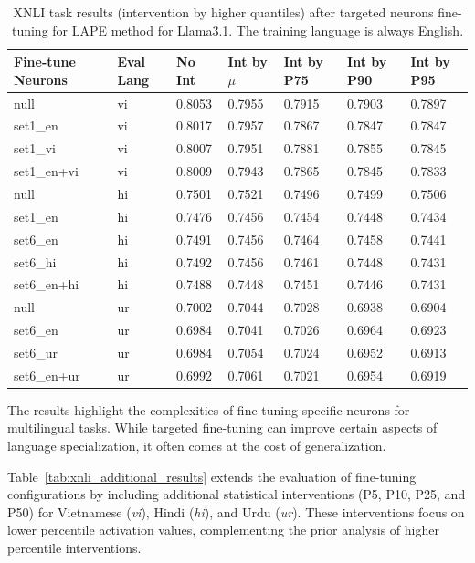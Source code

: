 \begin{table}[ht]
	\centering
	\renewcommand{\arraystretch}{1.3}
	\setlength{\tabcolsep}{4pt}
	\begin{tabularx}{\textwidth}{|X|X|X|X|X|X|X|}
		\hline
		\textbf{Fine-tune Neurons} & \textbf{Eval Lang} & \textbf{No Int} & \textbf{Int by $\mu$} & \textbf{Int by P75} & \textbf{Int by P90} & \textbf{Int by P95} \\
		\hline
		null & vi & 0.8053 & 0.7955 & 0.7915 & 0.7903 & 0.7897 \\
		set1\_en & vi & 0.8017 & 0.7957 & 0.7867 & 0.7847 & 0.7847 \\
		set1\_vi & vi & 0.8007 & 0.7951 & 0.7881 & 0.7855 & 0.7845 \\
		set1\_en+vi & vi & 0.8009 & 0.7943 & 0.7865 & 0.7845 & 0.7833 \\
		\hline
		null & hi & 0.7501 & 0.7521 & 0.7496 & 0.7499 & 0.7506 \\
		set1\_en & hi & 0.7476 & 0.7456 & 0.7454 & 0.7448 & 0.7434 \\
		set6\_en & hi & 0.7491 & 0.7456 & 0.7464 & 0.7458 & 0.7441 \\
		set6\_hi & hi & 0.7492 & 0.7456 & 0.7461 & 0.7448 & 0.7431 \\
		set6\_en+hi & hi & 0.7488 & 0.7448 & 0.7451 & 0.7446 & 0.7431 \\
		\hline
		null & ur & 0.7002 & 0.7044 & 0.7028 & 0.6938 & 0.6904 \\
		set6\_en & ur & 0.6984 & 0.7041 & 0.7026 & 0.6964 & 0.6923 \\
		set6\_ur & ur & 0.6984 & 0.7054 & 0.7024 & 0.6952 & 0.6913 \\
		set6\_en+ur & ur & 0.6992 & 0.7061 & 0.7021 & 0.6954 & 0.6919 \\
		\hline
	\end{tabularx}
	\caption{XNLI task results (intervention by higher quantiles) after targeted neurons fine-tuning for LAPE method for Llama3.1. The training language is always English.}
	\label{tab:xnli_results}
\end{table}

The results highlight the complexities of fine-tuning specific neurons for multilingual tasks. While targeted fine-tuning can improve certain aspects of language specialization, it often comes at the cost of generalization.

Table~\ref{tab:xnli_additional_results} extends the evaluation of fine-tuning configurations by including additional statistical interventions (P5, P10, P25, and P50) for Vietnamese (\textit{vi}), Hindi (\textit{hi}), and Urdu (\textit{ur}). These interventions focus on lower percentile activation values, complementing the prior analysis of higher percentile interventions.


